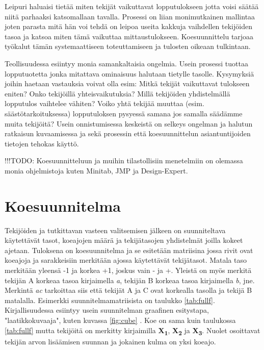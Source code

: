 \documentclass[12pt,a4paper,finnish]{tutthesis}
\newcommand\todo[1]{{\color{red}!!!TODO: #1}} %
\begin{document}
Leipuri haluaisi tietää miten tekijät vaikuttavat lopputulokseen jotta voisi
säätää niitä parhaaksi katsomallaan tavalla. Prosessi on liian monimutkainen
mallintaa joten parasta mitä hän voi tehdä on leipoa useita kakkuja vaihdellen
tekijöiden tasoa ja katsoa miten tämä vaikuttaa mittaustulokseen. Koesuunnittelu
tarjoaa työkalut tämän systemaattiseen toteuttamiseen ja tulosten oikeaan
tulkintaan.

Teollisuudessa esiintyy monia samankaltaisia ongelmia. Usein prosessi tuottaa
lopputuotetta jonka mitattava ominaisuus halutaan tietylle tasolle.
Kysymyksiä joihin haetaan vastauksia voivat olla esim: Mitkä tekijät vaikuttavat
tulokseen eniten? Onko tekijöillä yhteisvaikutuksia? Millä tekijöiden yhdistelmällä
lopputulos vaihtelee vähiten? Voiko yhtä tekijää muuttaa (esim. säästötarkoituksessa)
lopputuloksen pysyessä samana jos samalla säädämme muita tekijöitä?
Usein onnistumisessa keskeistä on selkeys ongelman ja halutun ratkaisun
kuvaamisessa ja sekä prosessin että koesuunnittelun asiantuntijoiden tietojen
tehokas käyttö.

\todo
Koesuunnitteluun ja muihin tilastollisiin menetelmiin on olemassa monia ohjelmistoja
kuten Minitab, JMP ja Design-Expert.

\section{Koesuunnitelma}
\label{doe}

Tekijöiden ja tutkittavan vasteen valitsemisen jälkeen on suunniteltava käytettävät
tasot, koeajojen määrä ja tekijätasojen yhdistelmät joilla kokeet ajetaan.
Tuloksena on koesuunnitelma ja se esitetään matriisina jossa rivit ovat
koeajoja ja sarakkeisiin merkitään ajossa käytettävät tekijätasot.
Matala taso merkitään yleensä -1 ja korkea +1, joskus vain - ja +.
Yleistä on myös merkitä tekijän A korkeaa tasoa kirjaimella \textit{a}, tekijän
B korkeaa tasoa kirjaimella \textit{b}, jne. Merkintä \textit{ac} tarkoittaa siis
että
tekijät A ja C ovat korkealla tasolla ja tekijä B matalalla. Esimerkki
suunnitelmamatriisista on taulukko \ref{tab:fullf}.
Kirjallisuudessa esiintyy usein suunnitelman graafinen esitystapa,
"laatikkokuvaaja", kuten kuvassa \ref{fig:cube} \textcite{ehandbook}.
Koe on sama kuin taulukossa \ref{tab:fullf} mutta tekijöitä on
merkitty kirjaimilla \textbf{X\textsubscript{1}}, \textbf{X\textsubscript{2}}
ja \textbf{X\textsubscript{3}}. Nuolet osoittavat tekijän arvon lisäämisen
suunnan ja jokainen kulma on yksi koeajo.
\end{document}

